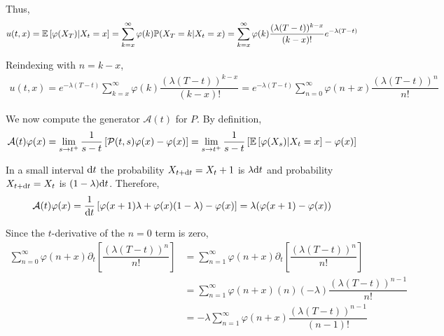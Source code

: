 \begin{solution}[Solution]
\begin{enumerate}[label=(\alph*)]
        Thus,
        \begin{align*}
            u(t,x) = \mathbb{E} \left[ \varphi(X_T) | X_t = x \right]
            = \sum_{k=x}^{\infty} \varphi(k) \mathbb{P} (X_T = k | X_t = x)
            = \sum_{k=x}^{\infty} \varphi(k) \dfrac{(\lambda(T-t))^{k-x}}{(k-x)!}e^{-\lambda (T-t)}
        \end{align*}
        
        Reindexing with \( n= k-x \),
        \begin{align*}
            u(t,x)  
            = e^{-\lambda (T-t)} \sum_{k=x}^{\infty} \varphi(k) \dfrac{(\lambda(T-t))^{k-x}}{(k-x)!}
            = e^{-\lambda (T-t)} \sum_{n=0}^{\infty} \varphi(n+x) \dfrac{(\lambda(T-t))^{n}}{n!}
        \end{align*}
        

        We now compute the generator \( \mathcal{A} (t) \) for \( P \). By definition,
        \begin{align*}
            \mathcal{A} (t) \varphi(x) 
            = \lim_{s\to t^+} \dfrac{1}{s-t} \left[ \mathcal{P}(t,s) \varphi(x) - \varphi(x)  \right]
            = \lim_{s\to t^+} \dfrac{1}{s-t} \left[ \mathbb{E} \left[ \varphi(X_s) | X_t=x \right] - \varphi(x)  \right]
        \end{align*}
       
        In a small interval \( \mathrm{d} t \) the probability \( X_{t+\mathrm{d} t} = X_t + 1 \) is \( \lambda \mathrm{d} t \) and probability \( X_{t+\mathrm{d} t} = X_t \) is \( (1-\lambda)\mathrm{d} t \). Therefore,
        \begin{align*}
            \mathcal{A} (t) \varphi(x) = \dfrac{1}{\mathrm{d} t} \left[\varphi(x+1) \lambda + \varphi(x) (1-\lambda) - \varphi(x) \right]
            = \lambda(\varphi(x+1) - \varphi(x))
        \end{align*}
        
    
        Since the \( t \)-derivative of the \( n=0 \) term is zero,
        \begin{align*}
            \sum_{n=0}^{\infty} \varphi(n+x) \partial_t \left[ \dfrac{(\lambda(T-t))^n}{n!} \right]
            &= \sum_{n=1}^{\infty} \varphi(n+x) \partial_t \left[ \dfrac{(\lambda(T-t))^n}{n!} \right]
            \\&= \sum_{n=1}^{\infty} \varphi(n+x) (n)(-\lambda)\dfrac{(\lambda(T-t))^{n-1}}{n!}
            \\&= -\lambda\sum_{n=1}^{\infty} \varphi(n+x) \dfrac{(\lambda(T-t))^{n-1}}{(n-1)!}
        \end{align*}
        

\end{enumerate}
\end{solution}
